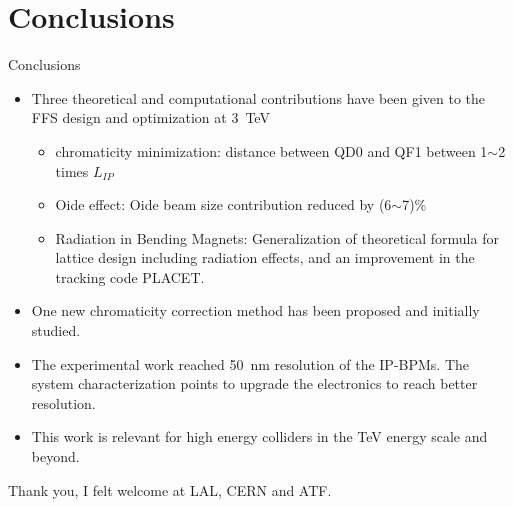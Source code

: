 \documentclass{beamer}
\begin{document}
\section{Conclusions}
\begin{frame}{Conclusions}
\scriptsize
 \begin{itemize}
  \item Three theoretical and computational contributions have been given to the FFS design and optimization at 3~TeV
  \begin{itemize}\scriptsize
  \item chromaticity minimization: distance between QD0 and QF1 between 1$\sim$2 times $L_{IP}$
  \item Oide effect: Oide beam size contribution reduced by (6$\sim$7)\%
  \item Radiation in Bending Magnets: Generalization of theoretical formula for lattice design including radiation effects, and an improvement in the tracking code PLACET.
  \end{itemize}
  \item One new chromaticity correction method has been proposed and initially studied.
  \item The experimental work reached 50~nm resolution of the IP-BPMs. The system characterization points to upgrade the electronics to reach better resolution.
  \item This work is relevant for high energy colliders in the TeV energy scale and beyond.
 \end{itemize}
 Thank you, I felt welcome at LAL, CERN and ATF.
\end{frame}
\end{document}
